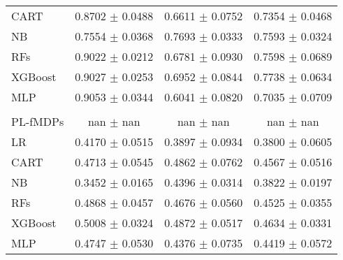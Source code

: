 \begin{table}[htbp]
\begin{tabular}{|l|ccc|}
CART & 0.8702 $\pm$ 0.0488 & 0.6611 $\pm$ 0.0752 & 0.7354 $\pm$ 0.0468 \\
NB & 0.7554 $\pm$ 0.0368 & 0.7693 $\pm$ 0.0333 & 0.7593 $\pm$ 0.0324 \\
RFs & 0.9022 $\pm$ 0.0212 & 0.6781 $\pm$ 0.0930 & 0.7598 $\pm$ 0.0689 \\
XGBoost & 0.9027 $\pm$ 0.0253 & 0.6952 $\pm$ 0.0844 & 0.7738 $\pm$ 0.0634 \\
MLP & 0.9053 $\pm$ 0.0344 & 0.6041 $\pm$ 0.0820 & 0.7035 $\pm$ 0.0709 \\
\midrule
\vspace{2mm}
\multicolumn{4}{|c|}{\textbf{Driver 4}} \\
\hline
PL-fMDPs & nan $\pm$ nan & nan $\pm$ nan & nan $\pm$ nan \\
LR & 0.4170 $\pm$ 0.0515 & 0.3897 $\pm$ 0.0934 & 0.3800 $\pm$ 0.0605 \\
CART & 0.4713 $\pm$ 0.0545 & 0.4862 $\pm$ 0.0762 & 0.4567 $\pm$ 0.0516 \\
NB & 0.3452 $\pm$ 0.0165 & 0.4396 $\pm$ 0.0314 & 0.3822 $\pm$ 0.0197 \\
RFs & 0.4868 $\pm$ 0.0457 & 0.4676 $\pm$ 0.0560 & 0.4525 $\pm$ 0.0355 \\
XGBoost & 0.5008 $\pm$ 0.0324 & 0.4872 $\pm$ 0.0517 & 0.4634 $\pm$ 0.0331 \\
MLP & 0.4747 $\pm$ 0.0530 & 0.4376 $\pm$ 0.0735 & 0.4419 $\pm$ 0.0572 \\
\hline
\end{tabular}
\end{table}
